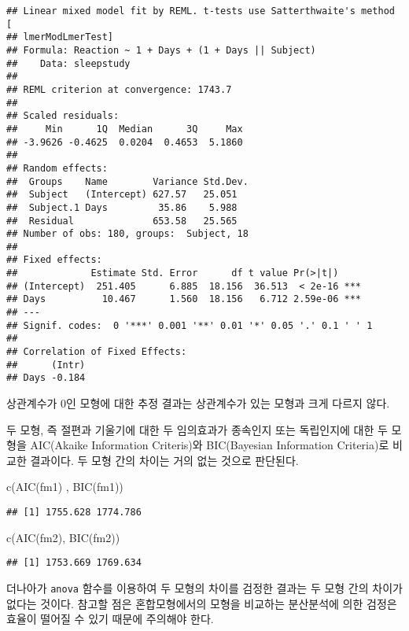\documentclass[
]{book}
\newenvironment{Shaded}{\begin{snugshade}}{\end{snugshade}}
\newcommand{\FunctionTok}[1]{\textcolor[rgb]{0.00,0.00,0.00}{#1}}
\newcommand{\NormalTok}[1]{#1}
\begin{document}
\begin{verbatim}
## Linear mixed model fit by REML. t-tests use Satterthwaite's method [
## lmerModLmerTest]
## Formula: Reaction ~ 1 + Days + (1 + Days || Subject)
##    Data: sleepstudy
## 
## REML criterion at convergence: 1743.7
## 
## Scaled residuals: 
##     Min      1Q  Median      3Q     Max 
## -3.9626 -0.4625  0.0204  0.4653  5.1860 
## 
## Random effects:
##  Groups    Name        Variance Std.Dev.
##  Subject   (Intercept) 627.57   25.051  
##  Subject.1 Days         35.86    5.988  
##  Residual              653.58   25.565  
## Number of obs: 180, groups:  Subject, 18
## 
## Fixed effects:
##             Estimate Std. Error      df t value Pr(>|t|)    
## (Intercept)  251.405      6.885  18.156  36.513  < 2e-16 ***
## Days          10.467      1.560  18.156   6.712 2.59e-06 ***
## ---
## Signif. codes:  0 '***' 0.001 '**' 0.01 '*' 0.05 '.' 0.1 ' ' 1
## 
## Correlation of Fixed Effects:
##      (Intr)
## Days -0.184
\end{verbatim}

상관계수가 0인 모형에 대한 추정 결과는 상관계수가 있는 모형과 크게 다르지 않다.

두 모형, 즉 절편과 기울기에 대한 두 임의효과가 종속인지 또는 독립인지에 대한 두 모형을 AIC(Akaike Information Criteris)와 BIC(Bayesian Information Criteria)로 비교한 결과이다. 두 모형 간의 차이는 거의 없는 것으로 판단된다.

\begin{Shaded}
\begin{Highlighting}[]
\FunctionTok{c}\NormalTok{(}\FunctionTok{AIC}\NormalTok{(fm1) , }\FunctionTok{BIC}\NormalTok{(fm1))}
\end{Highlighting}
\end{Shaded}

\begin{verbatim}
## [1] 1755.628 1774.786
\end{verbatim}

\begin{Shaded}
\begin{Highlighting}[]
\FunctionTok{c}\NormalTok{(}\FunctionTok{AIC}\NormalTok{(fm2), }\FunctionTok{BIC}\NormalTok{(fm2))}
\end{Highlighting}
\end{Shaded}

\begin{verbatim}
## [1] 1753.669 1769.634
\end{verbatim}

더나아가 \texttt{anova} 함수를 이용하여 두 모형의 차이를 검정한 결과는 두 모형 간의 차이가 없다는 것이다. 참고할 점은 혼합모형에서의 모형을 비교하는 분산분석에 의한 검정은 효율이 떨어질 수 있기 때문에 주의해야 한다.
\end{document}
